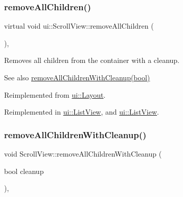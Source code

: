 \subsubsection{\texorpdfstring{remove\+All\+Children()}{removeAllChildren()}\hspace{0.1cm}{\footnotesize\ttfamily [2/2]}}
{\footnotesize\ttfamily virtual void ui\+::\+Scroll\+View\+::remove\+All\+Children (\begin{DoxyParamCaption}{ }\end{DoxyParamCaption})\hspace{0.3cm}{\ttfamily [override]}, {\ttfamily [virtual]}}

Removes all children from the container with a cleanup.

\begin{DoxySeeAlso}{See also}
{\ttfamily \hyperlink{classui_1_1ScrollView_ac71d0fe89be6291abbccf6a6f8f011b4}{remove\+All\+Children\+With\+Cleanup(bool)}} 
\end{DoxySeeAlso}


Reimplemented from \hyperlink{classui_1_1Layout_a6b40fa4ad7a14a1eece297e466e2c86e}{ui\+::\+Layout}.



Reimplemented in \hyperlink{classui_1_1ListView_acfa88e95692c1e9713697fbd2754379b}{ui\+::\+List\+View}, and \hyperlink{classui_1_1ListView_a7e534825fe60406ed544a254b0975489}{ui\+::\+List\+View}.

\mbox{\label{classui_1_1ScrollView_ac71d0fe89be6291abbccf6a6f8f011b4}} 
\subsubsection{\texorpdfstring{remove\+All\+Children\+With\+Cleanup()}{removeAllChildrenWithCleanup()}\hspace{0.1cm}{\footnotesize\ttfamily [1/2]}}
{\footnotesize\ttfamily void Scroll\+View\+::remove\+All\+Children\+With\+Cleanup (\begin{DoxyParamCaption}\item[{bool}]{cleanup }\end{DoxyParamCaption})\hspace{0.3cm}{\ttfamily [override]}, {\ttfamily [virtual]}}

